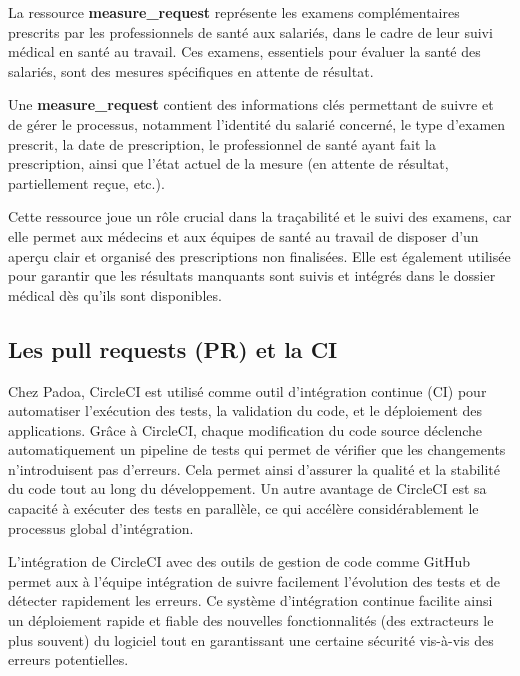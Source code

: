 La ressource \textbf{measure\_request} représente les examens complémentaires prescrits par les professionnels de santé aux salariés, dans le cadre de leur suivi médical en santé au travail. Ces examens, essentiels pour évaluer la santé des salariés, sont des mesures spécifiques en attente de résultat. 

Une \textbf{measure\_request} contient des informations clés permettant de suivre et de gérer le processus, notamment l’identité du salarié concerné, le type d’examen prescrit, la date de prescription, le professionnel de santé ayant fait la prescription, ainsi que l’état actuel de la mesure (en attente de résultat, partiellement reçue, etc.).

Cette ressource joue un rôle crucial dans la traçabilité et le suivi des examens, car elle permet aux médecins et aux équipes de santé au travail de disposer d’un aperçu clair et organisé des prescriptions non finalisées. Elle est également utilisée pour garantir que les résultats manquants sont suivis et intégrés dans le dossier médical dès qu’ils sont disponibles. 

\subsection{Les pull requests (PR) et la CI}

Chez Padoa, CircleCI est utilisé comme outil d'intégration continue (CI) pour automatiser l'exécution des tests, la validation du code, et le déploiement des applications. Grâce à CircleCI, chaque modification du code source déclenche automatiquement un pipeline de tests qui permet de vérifier que les changements n’introduisent pas d’erreurs. Cela permet ainsi d’assurer la qualité et la stabilité du code tout au long du développement. Un autre avantage de CircleCI est sa capacité à exécuter des tests en parallèle, ce qui accélère considérablement le processus global d'intégration.

L'intégration de CircleCI avec des outils de gestion de code comme GitHub permet aux à l'équipe intégration de suivre facilement l’évolution des tests et de détecter rapidement les erreurs. Ce système d'intégration continue facilite ainsi un déploiement rapide et fiable des nouvelles fonctionnalités (des extracteurs le plus souvent) du logiciel tout en garantissant une certaine sécurité vis-à-vis des erreurs potentielles.

